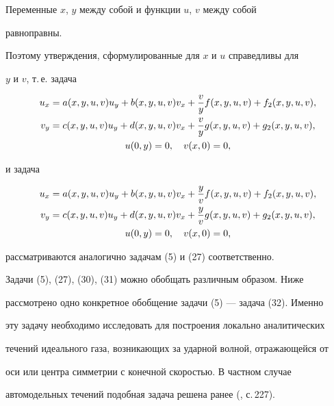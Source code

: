 \begin{notenonum}


Переменные $x$, $y$ между собой и функции $u$, $v$ между собой


равноправны.


Поэтому утверждения, сформулированные для $x$ и $u$ справедливы для


$y$ и $v$, т.\,е. задача


\begin{gather}


u_x=a(x,y,u,v)u_y+b(x,y,u,v)v_x+\frac{v}{y}f(x,y,u,v)+


f_2(x,y,u,v),\notag\\


v_y=c(x,y,u,v)u_y+d(x,y,u,v)v_x+\frac{v}{y}g(x,y,u,v)+g_2(x,y,u,v),\\


u(0,y)=0,\quad v(x,0)=0,\notag


\end{gather}


и задача


\begin{gather}


u_x=a(x,y,u,v)u_y+b(x,y,u,v)v_x+\frac{y}{v}f(x,y,u,v)+


f_2(x,y,u,v),\notag\\


v_y=c(x,y,u,v)u_y+d(x,y,u,v)v_x+\frac{y}{v}g(x,y,u,v)+g_2(x,y,u,v),\\


u(0,y)=0,\quad v(x,0)=0,\notag


\end{gather}


рассматриваются аналогично задачам (5) и (27) соответственно.


\end{notenonum}





Задачи (5), (27), (30), (31) можно обобщать различным образом. Ниже


рассмотрено одно конкретное обобщение задачи (5) --- задача (32). Именно


эту задачу необходимо исследовать для построения локально аналитических


течений идеального газа, возникающих за ударной волной, отражающейся от


оси или центра симметрии с конечной скоростью. В частном случае


автомодельных течений подобная задача решена ранее (\cite{7}, с.\,227).


